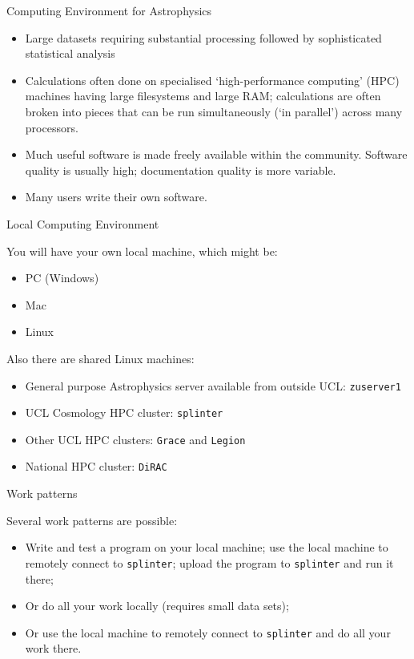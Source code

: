 \documentclass{beamer}
\begin{document}
\begin{frame}{Computing Environment for Astrophysics}
  \begin{itemize}
  \item Large datasets requiring substantial processing followed by sophisticated statistical analysis
  \item Calculations often done on specialised `high-performance computing' (HPC) machines having large filesystems and large RAM; calculations are often broken into pieces that can be run simultaneously (`in parallel') across many processors.
  \item Much useful software is made freely available within the community. Software quality is usually high; documentation quality is more variable.
  \item Many users write their own software.
  \end{itemize}
\end{frame}

\begin{frame}{Local Computing Environment}
  \begin{block}{You will have your own local machine, which might be:}
    \begin{itemize}
      \item PC (Windows)
      \item Mac
      \item Linux
    \end{itemize}
  \end{block}
  \begin{block}{Also there are shared Linux machines:}
    \begin{itemize}
      \item General purpose Astrophysics server available from outside UCL: \alert{\texttt{zuserver1}}
      \item UCL Cosmology HPC cluster: \alert{\texttt{splinter}}
      \item Other UCL HPC clusters: \alert{\texttt{Grace}} and \alert{\texttt{Legion}}
      \item National HPC cluster: \alert{\texttt{DiRAC}}
    \end{itemize}
  \end{block}
\end{frame}

\begin{frame}{Work patterns}
  \begin{block}{Several work patterns are possible:}
    \begin{itemize}
      \item Write and test a program on your local machine; use the local machine to remotely connect to \texttt{splinter}; upload the program to \texttt{splinter} and run it there;
      \item Or do all your work locally (requires small data sets);
      \item Or use the local machine to remotely connect to \texttt{splinter} and do all your work there.
    \end{itemize}
  \end{block}
\end{frame}
\end{document}
